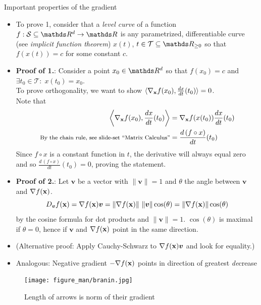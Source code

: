 \documentclass[11pt,compress,t,notes=noshow, xcolor=table]{beamer}
\newcommand{\deriv}{d}
\begin{document}
\begin{vbframe}{Important properties of the gradient}

\framebreak
\begin{itemize}\setlength{\itemsep}{0.5\baselineskip}
    \item To prove 1, consider that a \emph{level curve} of a function $f: \mathcal{S}\subseteq \R^d \to \R$ is any parametrized, differentiable curve (see \emph{implicit function theorem}) $x(t)$, $t\in\mathcal{T}\subseteq\R_{\geq 0}$ so that $f(x(t))=c$ for some constant $c$.
    \item \textbf{Proof of 1.}: Consider a point $x_0\in\R^d$ so that $f(x_0)=c$ and $\exists t_0\in\mathcal{T}:\; x(t_0)=x_0$.\\\bigskip
    To prove orthogonality, we want to show $\langle\nabla_{\xv}f(x_0),\frac{\deriv x}{\deriv t}(t_0)\rangle=0$.\\
    Note that\begin{align*}
        \left\langle\nabla_{\xv}f(x_0),\frac{\deriv x}{\deriv t}(t_0)\right\rangle&=\nabla_{\xv}f(x(t_0))\frac{\deriv x}{\deriv t}(t_0)\\
        \text{\footnotesize By the chain rule, see slide-set ``Matrix Calculus''}&=\frac{\deriv\, (f\circ x)}{\deriv t}(t_0)
    \end{align*}
    Since $f\circ x$ is a constant function in $t$, the derivative will always equal zero and so $\frac{\deriv\, (f\circ x)}{\deriv t}(t_0)=0$, proving the statement.
\end{itemize}
\framebreak
\begin{itemize}\setlength{\itemsep}{0.5\baselineskip}
    \item \textbf{Proof of 2.}: Let $\bm{v}$ be a vector with $\|\bm{v}\|=1$ and $\theta$ the angle between $\bm{v}$ and $\nabla f(\mathbf{x})$.
        \begin{equation*}
            D_{\bm{v}}f(\mathbf{x}) = \nabla f(\mathbf{x}) \bm{v} = \|\nabla f(\mathbf{x})\|~\|\bm{v}\|\cos(\theta) = \|\nabla f(\mathbf{x})\| \cos(\theta)
        \end{equation*}
    	by the cosine formula for dot products and $\|\bm{v}\| = 1$.
        $\cos(\theta)$ is maximal if $\theta = 0$, hence if $\bm{v}$ and $\nabla f(\mathbf{x})$ point in the same direction.

    	\item (Alternative proof: Apply Cauchy-Schwarz to $\nabla f(\mathbf{x}) \bm{v}$ and look for equality.)

        \item Analogous: Negative gradient $- \nabla f(\mathbf{x})$ points in direction of greatest \textit{de}crease
\end{itemize}
\framebreak

\begin{figure}
    \centering
    \texttt{[image: figure\_man/branin.jpg]}
    \caption*{Length of arrows is norm of their gradient}
\end{figure}

\end{vbframe}
\end{document}
